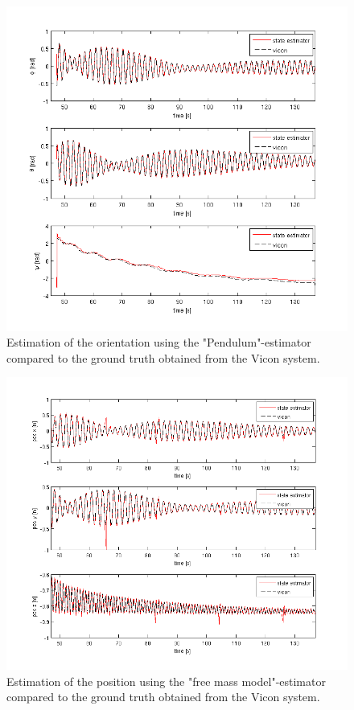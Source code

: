 \begin{figure}
\centering
\includegraphics[width=1\textwidth]{pictures/2_2_SNR5_orientation_GPS.png}
\caption{Estimation of the orientation using the "Pendulum"-estimator compared to the ground truth obtained from the Vicon system.}
\label{orientation}
\end{figure}
\begin{figure}[hb]
\centering
\includegraphics[width=1\textwidth]{pictures/2_2_fmm_SNR5_pos_GPS.png}
\caption{Estimation of the position using the "free mass model"-estimator compared to the ground truth obtained from the Vicon system.}
\label{pos_fmm}
\end{figure}

